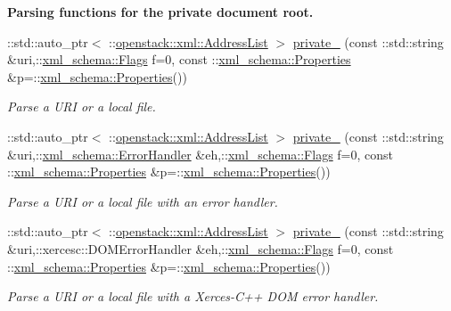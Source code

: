 \begin{Indent}{\bf Parsing functions for the private document root.}\par
\begin{DoxyCompactItemize}
\item 
::std::auto\_\-ptr$<$ ::\hyperlink{classopenstack_1_1xml_1_1AddressList}{openstack::xml::AddressList} $>$ \hyperlink{namespaceopenstack_1_1xml_a5b8acea9fd6c8d2afe7668207ef58fa3}{private\_\-} (const ::std::string \&uri,::\hyperlink{namespacexml__schema_affb4c227cbd9aa7453dd1dc5a1401943}{xml\_\-schema::Flags} f=0, const ::\hyperlink{namespacexml__schema_ad27ce19a7ee1d3b1064092648898f64c}{xml\_\-schema::Properties} \&p=::\hyperlink{namespacexml__schema_ad27ce19a7ee1d3b1064092648898f64c}{xml\_\-schema::Properties}())
\begin{DoxyCompactList}\small\item\em Parse a URI or a local file. \item\end{DoxyCompactList}\item 
::std::auto\_\-ptr$<$ ::\hyperlink{classopenstack_1_1xml_1_1AddressList}{openstack::xml::AddressList} $>$ \hyperlink{namespaceopenstack_1_1xml_a45cf027d0ea54cc4bb114c5f6faec5e9}{private\_\-} (const ::std::string \&uri,::\hyperlink{namespacexml__schema_ab1c9361bfd3b404eaabf0c31eded79dc}{xml\_\-schema::ErrorHandler} \&eh,::\hyperlink{namespacexml__schema_affb4c227cbd9aa7453dd1dc5a1401943}{xml\_\-schema::Flags} f=0, const ::\hyperlink{namespacexml__schema_ad27ce19a7ee1d3b1064092648898f64c}{xml\_\-schema::Properties} \&p=::\hyperlink{namespacexml__schema_ad27ce19a7ee1d3b1064092648898f64c}{xml\_\-schema::Properties}())
\begin{DoxyCompactList}\small\item\em Parse a URI or a local file with an error handler. \item\end{DoxyCompactList}\item 
::std::auto\_\-ptr$<$ ::\hyperlink{classopenstack_1_1xml_1_1AddressList}{openstack::xml::AddressList} $>$ \hyperlink{namespaceopenstack_1_1xml_a0a6b97db83d38425a51e1e049ac9c2cb}{private\_\-} (const ::std::string \&uri,::xercesc::DOMErrorHandler \&eh,::\hyperlink{namespacexml__schema_affb4c227cbd9aa7453dd1dc5a1401943}{xml\_\-schema::Flags} f=0, const ::\hyperlink{namespacexml__schema_ad27ce19a7ee1d3b1064092648898f64c}{xml\_\-schema::Properties} \&p=::\hyperlink{namespacexml__schema_ad27ce19a7ee1d3b1064092648898f64c}{xml\_\-schema::Properties}())
\begin{DoxyCompactList}\small\item\em Parse a URI or a local file with a Xerces-\/C++ DOM error handler. \item\end{DoxyCompactList}\item 

\end{DoxyCompactItemize}
\end{Indent}
